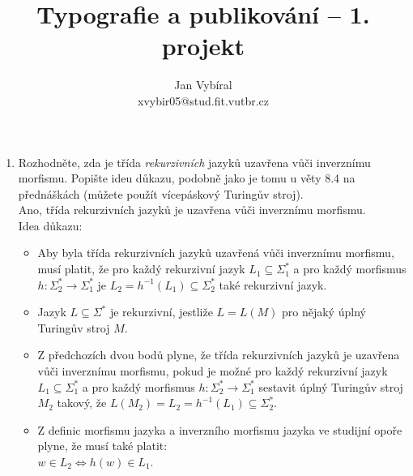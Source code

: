\documentclass[a4paper,11pt]{article}[24.3.2010]
\author{Jan Vybíral\\xvybir05@stud.fit.vutbr.cz}
\title{Typografie a publikování -- 1. projekt}
\date{}
\begin{document}
\begin{enumerate}
\item Rozhodněte, zda je třída \emph{rekurzivních} jazyků uzavřena vůči inverznímu morfismu. Popište ideu důkazu, podobně jako je tomu u věty 8.4 na přednáškách (můžete použít vícepáskový Turingův stroj).\\

Ano, třída rekurzivních jazyků je uzavřena vůči inverznímu morfismu.\\

Idea důkazu:

\begin{itemize}
\item Aby byla třída rekurzivních jazyků uzavřená vůči inverznímu morfismu, musí platit, že pro každý rekurzivní jazyk $L_{1}\subseteq\Sigma_{1}^*$ a pro každý morfismus $h : \Sigma_{2}^* \rightarrow \Sigma_{1}^*$ je $L_{2} = h^{-1}(L_{1}) \subseteq \Sigma_{2}^*$ také rekurzivní jazyk.\\
\item Jazyk $L\subseteq\Sigma^*$ je rekurzivní, jestliže $L=L(M)$ pro nějaký úplný Turingův stroj $M$.\\
\item Z předchozích dvou bodů plyne, že třída rekurzivních jazyků je uzavřena vůči inverznímu morfismu, pokud je možné pro každý rekurzivní jazyk $L_{1}\subseteq\Sigma_{1}^*$ a pro každý morfismus $h : \Sigma_{2}^* \rightarrow \Sigma_{1}^*$ sestavit úplný Turingův stroj $M_{2}$ takový, že $L(M_{2})=L_{2} = h^{-1}(L_{1}) \subseteq \Sigma_{2}^*$.\\
\item Z definic morfismu jazyka a inverzního morfismu jazyka ve studijní opoře plyne, že musí také platit:\\
$w \in L_{2} \Leftrightarrow h(w) \in L_{1}$.\\


\end{itemize}
\end{enumerate}
\end{document}
